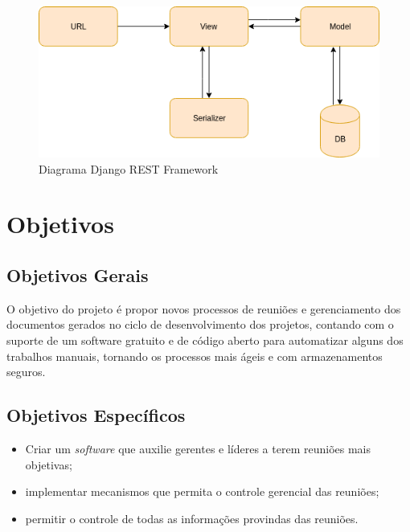 \begin{figure}[H]
	\centering
	\includegraphics[width=1.0\textwidth]{figuras/django_rest.png}
	\caption{Diagrama Django REST Framework}
	\label{img:diagrama_rest}
\end{figure}



\section{Objetivos}
\label{sec:objetivos}

\subsection{Objetivos Gerais}
\label{sec:objetivos_gerais}

O objetivo do projeto é propor novos processos de reuniões e gerenciamento dos documentos gerados no ciclo de desenvolvimento dos projetos, contando com o suporte de um software gratuito e de código aberto para automatizar alguns dos trabalhos manuais, tornando os processos mais ágeis e com armazenamentos seguros.

\subsection{Objetivos Específicos}
\label{sec:objetivos_especificos}

\begin{itemize}
    \item Criar um \textit{software} que auxilie gerentes e líderes a terem reuniões mais objetivas;
    \item implementar mecanismos que permita o controle gerencial das reuniões;
    \item permitir o controle de todas as informações provindas das reuniões.
\end{itemize}
